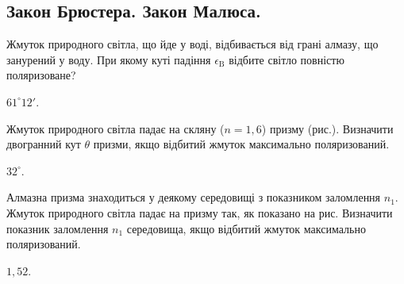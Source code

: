 \subsection*{Закон Брюстера. Закон Малюса.}


\begin{problem}%
     Жмуток природного світла, що йде у воді, відбивається від грані алмазу, що занурений у воду. При якому куті падіння $ \epsilon_\text{B} $ відбите світло повністю поляризоване?
    \begin{solution}
        $ 61^\circ12' $.
    \end{solution}
\end{problem}


\begin{problem}%
     Жмуток природного світла падає на скляну ($ n = 1,6 $) призму (рис.). Визначити двогранний кут $ \theta $ призми, якщо відбитий жмуток максимально поляризований.

     \begin{center}
         
     \end{center}
    \begin{solution}
        $ 32^\circ $.
    \end{solution}
\end{problem}


\begin{problem}%
    Алмазна призма знаходиться у деякому середовищі з показником
    заломлення $ n_1 $. Жмуток природного світла падає на призму так, як
    показано на рис. Визначити показник заломлення $ n_1 $ середовища,
    якщо відбитий жмуток максимально поляризований.

     \begin{center}
         
     \end{center}

    \begin{solution}
        $ 1,52 $.
    \end{solution}
\end{problem}


